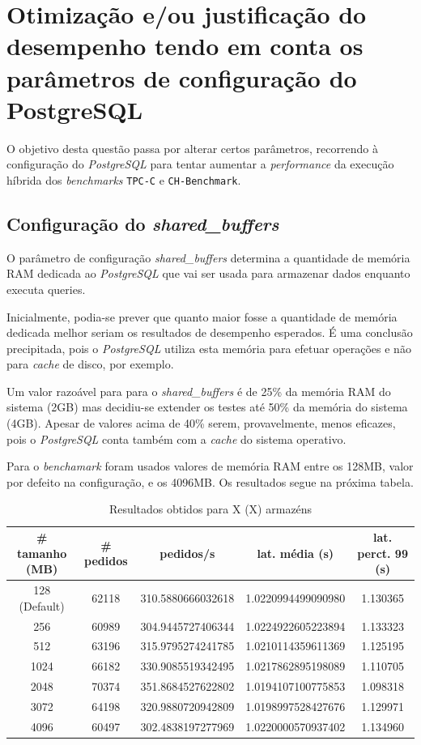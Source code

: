 \section{Otimização e/ou justificação do desempenho tendo em conta os parâmetros de configuração do PostgreSQL}

O objetivo desta questão passa por alterar certos parâmetros, recorrendo à configuração do \textit{PostgreSQL} para tentar aumentar a \textit{performance} da execução híbrida dos \textit{benchmarks} \verb+TPC-C+ e \verb+CH-Benchmark+.

\subsection{Configuração do \textit{shared\_buffers}}

O parâmetro de configuração \textit{shared\_buffers} determina a quantidade de memória RAM dedicada ao \textit{PostgreSQL} que vai ser usada para armazenar dados enquanto executa queries.

Inicialmente, podia-se prever que quanto maior fosse a quantidade de memória dedicada melhor seriam os resultados de desempenho esperados. É uma conclusão precipitada, pois o \textit{PostgreSQL} utiliza esta memória para efetuar operações e não para \textit{cache} de disco, por exemplo.

Um valor razoável para para o \textit{shared\_buffers} é de 25\% da memória RAM do sistema (2GB) mas decidiu-se extender os testes até 50\% da memória do sistema (4GB). Apesar de valores acima de 40\% serem, provavelmente, menos eficazes, pois o \textit{PostgreSQL} conta também com a \textit{cache} do sistema operativo.

Para o \textit{benchamark} foram usados valores de memória RAM entre os 128MB, valor por defeito na configuração, e os 4096MB. Os resultados segue na próxima tabela.

\begin{table}[!h]
\center
\small
\begin{tabular}{|c|c|c|c|c|}
\hline
\textbf{\# tamanho (MB)} & \textbf{\# pedidos} & \textbf{pedidos/s} & \textbf{lat. média (s)} & \textbf{lat. perct. 99 (s)}  \\ \hline
128 (Default) & 62118 & 310.5880666032618 & 1.0220994499090980 & 1.130365  \\ \hline
256 & 60989 & 304.9445727406344 & 1.0224922605223894 & 1.133323  \\ \hline
512 & 63196 & 315.9795274241785 & 1.0210114359611369 & 1.125195  \\ \hline
1024 & 66182 & 330.9085519342495 & 1.0217862895198089 & 1.110705  \\ \hline
2048 & 70374 & 351.8684527622802 & 1.0194107100775853 & 1.098318  \\ \hline
3072 & 64198 & 320.9880720942809 & 1.0198997528427676 & 1.129971  \\ \hline
4096 & 60497 & 302.4838197277969 & 1.0220000570937402 & 1.134960  \\ \hline
\end{tabular}
\caption{Resultados obtidos para X (X) armazéns}
\end{table}

